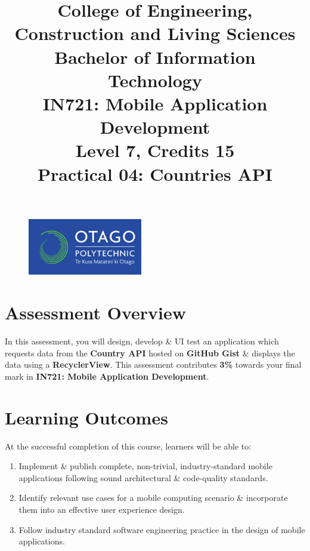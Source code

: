 \documentclass{article}
\author{}
\begin{document}
\begin{figure}
    \centering
    \includegraphics[width=50mm]{./img/logo.png}
\end{figure}

\title{College of Engineering, Construction and Living Sciences\\Bachelor of Information Technology\\IN721: Mobile Application Development\\Level 7, Credits 15\\\textbf{Practical 04: Countries API}}
\date{}
\maketitle

\section*{Assessment Overview}
In this assessment, you will design, develop \& UI test an application which requests data from the \textbf{Country API} hosted on \textbf{GitHub Gist} \& displays the data using a \textbf{RecyclerView}. This assessment contributes \textbf{3\%} towards your final mark in \textbf{IN721: Mobile Application Development}.

\section*{Learning Outcomes}
At the successful completion of this course, learners will be able to: 
\begin{enumerate}
	\item Implement \& publish complete, non-trivial, industry-standard mobile applications following sound architectural \& code-quality standards.
	\item Identify relevant use cases for a mobile computing scenario \& incorporate them into an effective user experience design.
	\item Follow industry standard software engineering practice in the design of mobile applications.
\end{enumerate} 
\end{document}
